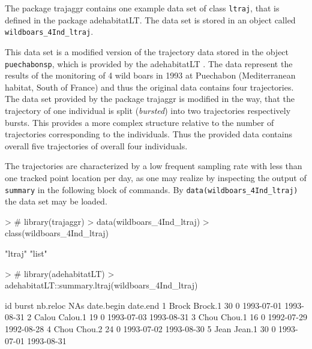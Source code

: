 \documentclass[12pt, oneside, a4paper]{scrbook}
\newcommand{\pkg}[1]{{\normalfont\fontseries{b}\selectfont #1}}
\let\code=\texttt
\newcommand{\codeintitles}[1]{{\tt #1}} %
\begin{document}

The package \pkg{trajaggr} contains one example data set of class \code{ltraj}, that is defined in the package \pkg{adehabitatLT}. The data set is stored in an object called \code{wildboars\_4Ind\_ltraj}.
\par\medskip

This data set is a modified version of the trajectory data stored in the object \code{puechabonsp}, which is provided by the \pkg{adehabitatLT} \citep{calenge_adehabitatlt:_2014}. The data represent the results of the monitoring of 4 wild boars in 1993 at Puechabon (Mediterranean habitat, South of France) and thus the original data contains four trajectories. The data set provided by the package \pkg{trajaggr} is modified in the way, that the trajectory of one individual is split (\textit{bursted}) into two trajectories respectively bursts. 
This provides a more complex structure relative to the number of trajectories corresponding to the individuals. Thus the provided data contains overall five trajectories of overall four individuals.
\par\medskip

The trajectories are characterized by a low frequent sampling rate with less than one tracked point location per day, as one may realize by inspecting the output of \code{summary} in the following block of commands. By \code{data(wildboars\_4Ind\_ltraj)} the data set may be loaded.
\par\medskip

\begin{small}
\begin{Schunk}
\begin{Sinput}
> # library(trajaggr)
> data(wildboars_4Ind_ltraj)
> class(wildboars_4Ind_ltraj)
\end{Sinput}
\begin{Soutput}
[1] "ltraj" "list" 
\end{Soutput}
\begin{Sinput}
> # library(adehabitatLT)
> adehabitatLT::summary.ltraj(wildboars_4Ind_ltraj)
\end{Sinput}
\begin{Soutput}
     id   burst nb.reloc NAs date.begin   date.end
1 Brock Brock.1       30   0 1993-07-01 1993-08-31
2 Calou Calou.1       19   0 1993-07-03 1993-08-31
3  Chou  Chou.1       16   0 1992-07-29 1992-08-28
4  Chou  Chou.2       24   0 1993-07-02 1993-08-30
5  Jean  Jean.1       30   0 1993-07-01 1993-08-31
\end{Soutput}
\end{Schunk}
\end{small}
\end{document}
